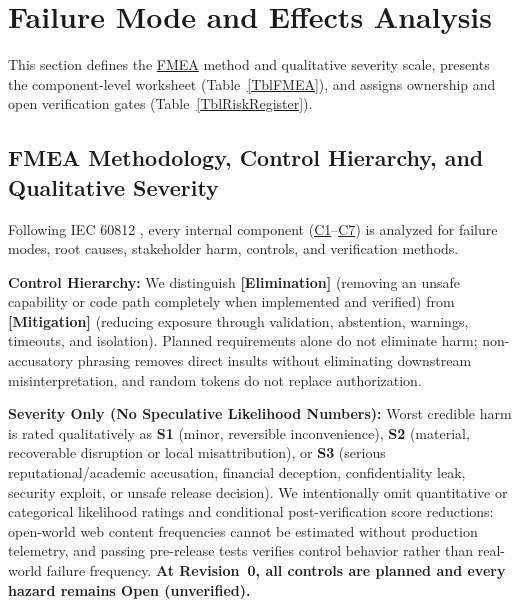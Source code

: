 \documentclass[11pt]{article}
\newcommand{\FMEA}{\hyperlink{ha-acr-fmea}{FMEA}}
\begin{document}
\section{Failure Mode and Effects Analysis}\label{sec:fmea}

This section defines the \FMEA{} method and qualitative severity scale, presents the component-level worksheet (Table~\ref{TblFMEA}), and assigns ownership and open verification gates (Table~\ref{TblRiskRegister}).

\subsection{FMEA Methodology, Control Hierarchy, and Qualitative Severity}
Following IEC 60812 \cite{IEC60812}, every internal component (\hyperref[comp:C1]{C1}--\hyperref[comp:C7]{C7}) is analyzed for failure modes, root causes, stakeholder harm, controls, and verification methods.

\noindent\textbf{Control Hierarchy:} We distinguish \textbf{[Elimination]} (removing an unsafe capability or code path completely when implemented and verified) from \textbf{[Mitigation]} (reducing exposure through validation, abstention, warnings, timeouts, and isolation). Planned requirements alone do not eliminate harm; non-accusatory phrasing removes direct insults without eliminating downstream misinterpretation, and random tokens do not replace authorization.

\noindent\textbf{Severity Only (No Speculative Likelihood Numbers):} Worst credible harm is rated qualitatively as \textbf{S1} (minor, reversible inconvenience), \textbf{S2} (material, recoverable disruption or local misattribution), or \textbf{S3} (serious reputational/academic accusation, financial deception, confidentiality leak, security exploit, or unsafe release decision). We intentionally omit quantitative or categorical likelihood ratings and conditional post-verification score reductions: open-world web content frequencies cannot be estimated without production telemetry, and passing pre-release tests verifies control behavior rather than real-world failure frequency. \textbf{At Revision~0, all controls are planned and every hazard remains Open (unverified).}
\end{document}
